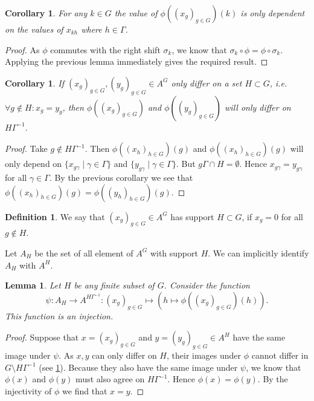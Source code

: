 \documentclass[titlepage, a4paper]{article}
\theoremstyle{theoremdd}
\newtheorem{lemma}[theorem]{Lemma}
\newtheorem{corollary}[theorem]{Corollary}
\theoremstyle{definition}
\newtheorem{definition}[theorem]{Definition}
\theoremstyle{remark}
\begin{document}
\begin{corollary}
	For any $k \in G$ the value of $\phi((x_g)_{g \in G})(k)$ is only dependent on the values of $x_{kh}$ where $h \in \Gamma$.
\end{corollary}	
\begin{proof}
	As $\phi$ commutes with the right shift  $\sigma_k$, we know that $\sigma_k \circ \phi = \phi \circ \sigma_k$. Applying the previous lemma immediately gives the required result.
\end{proof}

\begin{corollary}\label{cor:differ_in_image}
	If $(x_g)_{g \in G}, (y_g)_{g\in G} \in A^{G}$ only differ on a set $H \subset G$, i.e. $\forall g \not\in H:x_g = y_g$,
	then  $\phi((x_g)_{g \in G})$ and $\phi((y_g)_{g \in G})$ will only differ on $H\Gamma^{-1}$.
\end{corollary}
\begin{proof}
	Take $g \not\in H\Gamma^{-1}$. Then $\phi((x_h)_{h \in G})(g)$ and $\phi((x_h)_{h\in G})(g)$ will only depend on  $\{x_{g\gamma}\mid \gamma \in \Gamma\}$ and $\{y_{g\gamma}\mid \gamma \in \Gamma\} $. But  $g\Gamma \cap H = \emptyset$. Hence $x_{g\gamma} = y_{g\gamma}$ for all $\gamma \in \Gamma$. By the previous corollary we see that $\phi((x_h)_{h \in G})(g) = \phi((y_h)_{h \in G})(g)$.
\end{proof}

\begin{definition}
	We say that $(x_g)_{g \in G} \in A^{G}$ has support $H \subset G$, if $x_g = 0$ for all $g \not\in H$.
\end{definition}
Let $A_H$ be the set of all element of  $A^{G}$ with support $H$. We can implicitly identify $A_H$ with $A^{H}$.

\begin{lemma}\label{lem:injective_restriction}
	Let $H$ be any finite subset of $G$. Consider the function  \[
		\psi:A_H \to A ^{H\Gamma^{-1}}: (x_g)_{g \in G} \mapsto \left(h \mapsto \phi((x_g)_{g \in G})(h)\right)
	.\]  
	This function is an injection. 
\end{lemma}
\begin{proof}
	Suppose that $x= (x_g)_{g \in G}$ and $ y = (y_g)_{g \in G} \in A^{H}$ have the same image under $\psi$. As $x, y$ can only differ on $ H$, their images under $\phi$ cannot differ in $G\setminus H\Gamma^{-1}$ (see \cref{cor:differ_in_image}). Because they also have the same image under $\psi$, we know that $\phi(x)$ and $\phi(y)$ must also agree on $H\Gamma^{-1}$. Hence $\phi(x) = \phi(y)$. By the injectivity of $\phi$ we find that $x = y$.
\end{proof}
\end{document}
